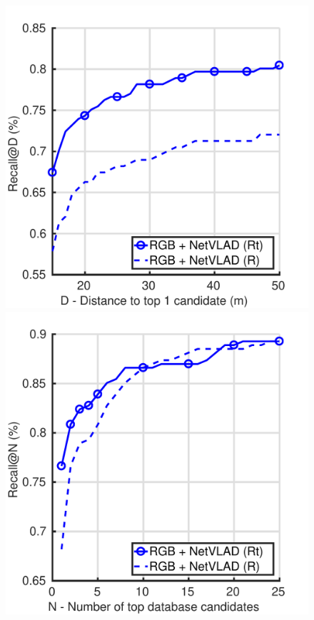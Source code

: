 \begin{figure}
	\centering
	\begin{minipage}{0.65\linewidth}
		\begin{minipage}{0.5\linewidth}
			\includegraphics[width=\linewidth]{details/rgb_r_trunc_distance}	
		\end{minipage}\hfill
		\begin{minipage}{0.5\linewidth}
			\includegraphics[width=\linewidth]{details/rgb_r_trunc_recall}	

\end{minipage}
\end{minipage}
\end{figure}
